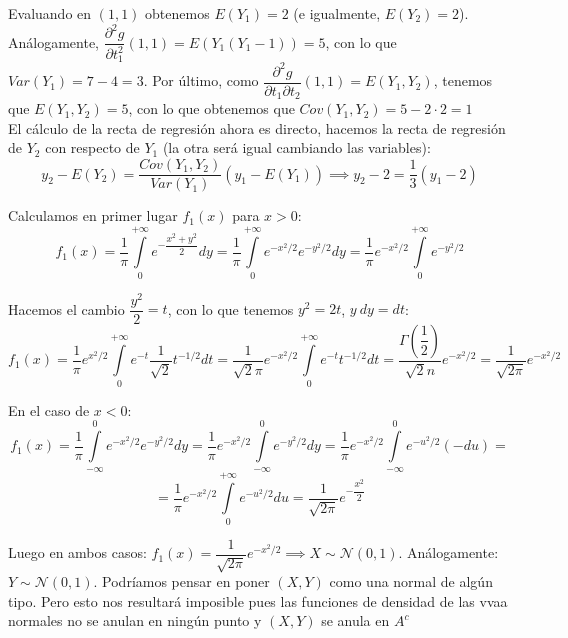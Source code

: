 \documentclass[openany]{book}
\begin{document}
\begin{exercise}
Evaluando en $ (1,1) $ obtenemos $ E(Y_1) = 2 $ (e igualmente, $ E(Y_2)=2 $). Análogamente, $ \dfrac{\partial ^2 g}{\partial t_1^2}(1,1) = E(Y_1(Y_1-1)) = 5 $, con lo que $ Var(Y_1) = 7-4=3 $. Por último, como $ \dfrac{\partial ^2 g}{\partial t_1 \partial t_2}(1,1) = E(Y_1,Y_2) $, tenemos que $ E(Y_1,Y_2) = 5 $, con lo que obtenemos que $ Cov(Y_1,Y_2) = 5-2\cdot 2 = 1 $\\

El cálculo de la recta de regresión ahora es directo, hacemos la recta de regresión de $ Y_2 $ con respecto de $ Y_1 $ (la otra será igual cambiando las variables):
$$ y_2-E(Y_2) = \dfrac{Cov(Y_1,Y_2)}{Var(Y_1)}(y_1-E(Y_1)) \implies y_2 -2 = \dfrac{1}{3}(y_1-2) $$


\end{exercise}



\setcounter{ex}{3} 
\begin{exercise}
    $  $\\

    Calculamos en primer lugar $ f_{1}(x) $ para $ x>0 $:
    $$f_{1}(x) = \dfrac{1}{\pi} \int\limits_{0}^{+\infty} e^{-\dfrac{x^2+y^2}{2}}dy = \dfrac{1}{\pi}\int\limits_{0}^{+\infty}e^{-x^2/2}e^{-y^2/2}dy = \dfrac{1}{\pi} e^{-x^2/2} \int\limits_{0}^{+\infty}e^{-y^2/2} $$

    Hacemos el cambio $ \dfrac{y^2}{2} = t $, con lo que tenemos $ y^2 = 2t $, $ y\ dy =dt  $:
    $$ f_{1}(x) = \dfrac{1}{\pi}e^{x^2/2} \int\limits_{0}^{+\infty}e^{-t}\dfrac{1}{\sqrt{2}}t^{-1/2} dt = \dfrac{1}{\sqrt{2}\pi} e^{-x^2/2}\int\limits_{0}^{+\infty}e^{-t}t^{-1/2}dt = \dfrac{\Gamma(\dfrac{1}{2})}{\sqrt{2}n}e^{-x^2/2} = \dfrac{1}{\sqrt{2\pi}}e^{-x^2/2} $$

    En el caso de $ x<0 $:
    $$ f_{1}(x) = \dfrac{1}{\pi}\int\limits_{-\infty}^{0}e^{-x^2/2}e^{-y^2/2}dy = \dfrac{1}{\pi}e^{-x^2/2}\int\limits_{-\infty}^{0}e^{-y^2/2}dy = \dfrac{1}{\pi}e^{-x^2/2}\int\limits_{-\infty}^{0}e^{-u^2/2}(-du) = $$
    $$ =  \dfrac{1}{\pi}e^{-x^2/2}\int\limits_{0}^{+\infty}e^{-u^2/2}du = \dfrac{1}{\sqrt{2\pi}}e^{-\dfrac{x^2}{2}} $$

    Luego en ambos casos: $ f_{1}(x) = \dfrac{1}{\sqrt{2\pi}}e^{-x^2/2} \implies X \sim \mathcal{N}(0,1) $. Análogamente: $ Y \sim \mathcal{N}(0,1) $. Podríamos pensar en poner $ (X,Y) $ como una normal de algún tipo. Pero esto nos resultará imposible pues las funciones de densidad de las vvaa normales no se anulan en ningún punto y $ (X,Y) $ se anula en $ A ^{c} $
\end{exercise}
\end{document}

